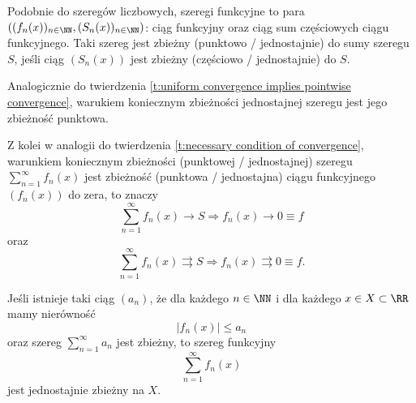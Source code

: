Podobnie do szeregów liczbowych, szeregi funkcyjne to para $((f_n(x))_{n\in\NN}, (S_n(x))_{n\in\NN})$: ciąg funkcyjny oraz ciąg sum częściowych ciągu funkcyjnego. Taki szereg jest zbieżny (punktowo / jednostajnie) do sumy szeregu $S$, jeśli ciąg $(S_n(x))$ jest zbieżny (częściowo / jednostajnie) do $S$.

Analogicznie do twierdzenia \ref{t:uniform convergence implies pointwise convergence}, warukiem koniecznym zbieżności jednostajnej szeregu jest jego zbieżność punktowa.

Z kolei w analogii do twierdzenia \ref{t:necessary condition of convergence}, warunkiem koniecznym zbieżności (punktowej / jednostajnej) szeregu $\sum_{n=1}^\infty f_n(x)$ jest zbieżność (punktowa / jednostajna) ciągu funkcyjnego $(f_n(x))$ do zera, to znaczy
\[ \sum_{n=1}^\infty f_n(x) \rightarrow S \Longrightarrow f_n(x) \rightarrow 0 \equiv f \]
oraz
\[ \sum_{n=1}^\infty f_n(x) \rightrightarrows S \Longrightarrow f_n(x) \rightrightarrows 0 \equiv f. \]

\begin{theorem}
    Jeśli istnieje taki ciąg $(a_n)$, że dla każdego $n \in \NN$ i dla każdego $x \in X \subset \RR$ mamy nierówność
    \[ |f_n(x)| \leq a_n \]
    oraz szereg $\sum_{n=1}^\infty a_n$ jest zbieżny, to szereg funkcyjny
    \[ \sum_{n=1}^\infty f_n(x) \]
    jest jednostajnie zbieżny na $X$.
\end{theorem}